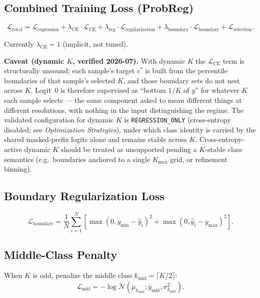\documentclass[11pt,a4paper]{article}
\theoremstyle{definition}
\begin{document}
\subsection{Combined Training Loss (ProbReg)}

\begin{equation}
  \mathcal{L}_{\mathrm{total}} = \mathcal{L}_{\mathrm{regression}} +
  \lambda_{\mathrm{CE}} \cdot \mathcal{L}_{\mathrm{CE}} +
  \lambda_{\mathrm{reg}} \cdot \mathcal{L}_{\mathrm{regularization}} +
  \lambda_{\mathrm{boundary}} \cdot \mathcal{L}_{\mathrm{boundary}} +
  \mathcal{L}_{\mathrm{selection}}.
  \label{eq:total_loss}
\end{equation}

Currently $\lambda_{\mathrm{CE}} = 1$ (implicit, not tuned).

\begin{implnote}
\textbf{Caveat (dynamic $K$, verified 2026-07).} With dynamic $K$ the
$\mathcal{L}_{\mathrm{CE}}$ term is structurally unsound: each sample's target $c^*$ is built
from the percentile boundaries of that sample's selected $K$, and those boundary sets do not
nest across $K$. Logit~0 is therefore supervised as ``bottom $1/K$ of $y$'' for whatever $K$
each sample selects — the same component asked to mean different things at different
resolutions, with nothing in the input distinguishing the regime. The validated configuration
for dynamic $K$ is \texttt{REGRESSION\_ONLY} (cross-entropy disabled; see \emph{Optimization
Strategies}), under which class identity is carried by the shared masked-prefix logits alone
and remains stable across $K$. Cross-entropy-active dynamic $K$ should be treated as
unsupported pending a $K$-stable class semantics (e.g.\ boundaries anchored to a single
$K_{\max}$ grid, or refinement binning).
\end{implnote}

\subsection{Boundary Regularization Loss}

\[
  \mathcal{L}_{\mathrm{boundary}} =
  \frac{1}{N}\sum_{i=1}^{N} \left[
    \max(0, y_{\min} - \hat{y}_i)^2 +
    \max(0, \hat{y}_i - y_{\max})^2
  \right].
\]

\subsection{Middle-Class Penalty}

When $K$ is odd, penalize the middle class $k_{\mathrm{mid}} = \lceil K/2 \rceil$:
\[
  \mathcal{L}_{\mathrm{mid}} = -\log\mathcal{N}(\mu_{k_{\mathrm{mid}}}; \bar{y}_{\mathrm{mid}}, \sigma_{k_{\mathrm{mid}}}^2).
\]
\end{document}
